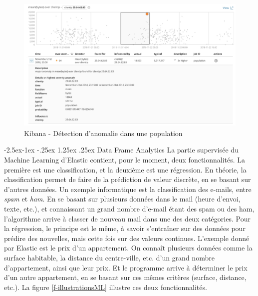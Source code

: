 \documentclass[paper=a4, fontsize=11pt]{scrartcl}
\makeatletter
\renewcommand\paragraph{\@startsection{paragraph}{4}{\z@}%
            {-2.5ex\@plus -1ex \@minus -.25ex}%
            {1.25ex \@plus .25ex}%
            {\normalfont\normalsize\bfseries}}
\makeatother
\begin{document}
\begin{figure}[H]
    \centering
    \includegraphics[width=18cm]{img/AD_elastic_population.jpg}
    \caption{Kibana - Détection d'anomalie dans une population \cite{noauthor_performing_nodate}}
    \label{f-kibana_ADpopulation}
\end{figure}

\paragraph{Data Frame Analytics}
La partie supervisée du Machine Learning d'Elastic contient, pour le moment, deux fonctionnalités. La première est une classification, et la deuxième est une régression. En théorie, la classification permet de faire de la prédiction de valeur discrète, en se basant sur d'autres données. Un exemple informatique est la classification des e-mails, entre \textit{spam} et \textit{ham}. En se basant sur plusieurs données dans le mail (heure d'envoi, texte, etc.), et connaissant un grand nombre d'e-mail étant des spam ou des ham, l'algorithme arrive à classer de nouveau mail dans une des deux catégories. \newline
Pour la régression, le principe est le même, à savoir s'entraîner sur des données pour prédire des nouvelles, mais cette fois sur des valeurs continues. L'exemple donné par Elastic est le prix d'un appartement. On connaît plusieurs données comme la surface habitable, la distance du centre-ville, etc. d'un grand nombre d'appartement, ainsi que leur prix. Et le programme arrive à déterminer le prix d'un autre appartement, en se basant sur ces mêmes critères (surface, distance, etc.). La figure \ref{f-illustrationsML} illustre ces deux fonctionnalités.
\end{document}
